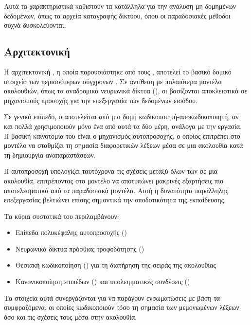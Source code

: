 Αυτά τα χαρακτηριστικά καθιστούν τα  κατάλληλα για την ανάλυση μη δομημένων δεδομένων, όπως τα αρχεία καταγραφής δικτύου, όπου οι παραδοσιακές μέθοδοι συχνά δυσκολεύονται.

\subsection{Αρχιτεκτονική }

Η αρχιτεκτονική , η οποία παρουσιάστηκε από τους  \cite{vaswani2017attention}, αποτελεί το βασικό δομικό στοιχείο των περισσότερων σύγχρονων . Σε αντίθεση με παλαιότερα μοντέλα ακολουθιών, όπως τα αναδρομικά νευρωνικά δίκτυα (), οι  βασίζονται αποκλειστικά σε μηχανισμούς προσοχής για την επεξεργασία των δεδομένων εισόδου.

Σε γενικό επίπεδο, ο  αποτελείται από μια δομή κωδικοποιητή-αποκωδικοποιητή, αν και πολλά  χρησιμοποιούν μόνο ένα από αυτά τα δύο μέρη, ανάλογα με την εργασία. Η βασική καινοτομία του  είναι ο μηχανισμός αυτοπροσοχής, ο οποίος επιτρέπει στο μοντέλο να σταθμίζει τη σημασία διαφορετικών λέξεων μέσα σε μια ακολουθία κατά τη δημιουργία αναπαραστάσεων.

Η αυτοπροσοχή υπολογίζει ταυτόχρονα τις σχέσεις μεταξύ όλων των  σε μια ακολουθία, επιτρέποντας στο μοντέλο να αποτυπώνει μακρινές εξαρτήσεις πιο αποτελεσματικά από τα παραδοσιακά μοντέλα. Αυτή η δυνατότητα παράλληλης επεξεργασίας βελτιώνει επίσης σημαντικά την αποδοτικότητα της εκπαίδευσης.

Τα κύρια συστατικά του  περιλαμβάνουν:
\begin{itemize}
    \item Επίπεδα πολυκέφαλης αυτοπροσοχής ()
    \item Νευρωνικά δίκτυα πρόσθιας τροφοδότησης ()
    \item Θεσιακή κωδικοποίηση () για τη διατήρηση της σειράς της ακολουθίας
    \item Κανονικοποίηση επιπέδων () και υπολειμματικές συνδέσεις ()
\end{itemize}

Τα στοιχεία αυτά συνεργάζονται για να παράγουν ενσωματώσεις με βάση τα συμφραζόμενα, οι οποίες κωδικοποιούν τόσο τη σημασία των μεμονωμένων λέξεων όσο και τις σχέσεις τους μέσα στην ακολουθία.

